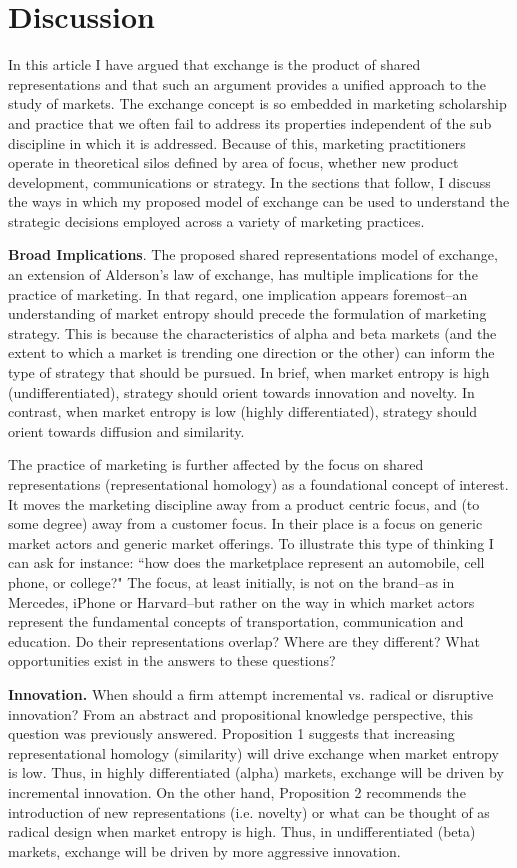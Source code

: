 \section{Discussion}
In this article I have argued that exchange is the product of shared representations and that such an argument provides a unified approach to the study of markets. The exchange concept is so embedded in marketing scholarship and practice that we often fail to address its properties independent of the sub discipline in which it is addressed. Because of this, marketing practitioners operate in theoretical silos defined by area of focus, whether new product development, communications or strategy. In the sections that follow, I discuss the ways in which my proposed model of exchange can be used to understand the strategic decisions employed across a variety of marketing practices.

\textbf{Broad Implications}.
The proposed shared representations model of exchange, an extension of Alderson's law of exchange, has multiple implications for the practice of marketing. In that regard, one implication appears foremost--an understanding of market entropy should precede the formulation of marketing strategy. This is because the characteristics of alpha and beta markets (and the extent to which a market is trending one direction or the other) can inform the type of strategy that should be pursued. In brief, when market entropy is high (undifferentiated), strategy should orient towards innovation and novelty. In contrast, when market entropy is low (highly differentiated), strategy should orient towards diffusion and similarity.  

The practice of marketing is further affected by the focus on shared representations (representational homology) as a foundational concept of interest. It moves the marketing discipline away from a product centric focus, and (to some degree) away from a customer focus. In their place is a focus on generic market actors and generic market offerings. To illustrate this type of thinking I can ask for instance: ``how does the marketplace represent an automobile, cell phone, or college?" The focus, at least initially, is not on the brand--as in Mercedes, iPhone or Harvard--but rather on the way in which market actors represent the fundamental concepts of transportation, communication and education. Do their representations overlap? Where are they different? What opportunities exist in the answers to these questions?     

\textbf{Innovation.}
When should a firm attempt incremental vs. radical or disruptive innovation? From an abstract and propositional knowledge perspective, this question was previously answered. Proposition 1 suggests that increasing representational homology (similarity) will drive exchange when market entropy is low. Thus, in highly differentiated (alpha) markets, exchange will be driven by incremental innovation. On the other hand, Proposition 2 recommends the introduction of new representations (i.e. novelty) or what can be thought of as radical design when market entropy is high. Thus, in undifferentiated (beta) markets, exchange will be driven by more aggressive innovation. 

